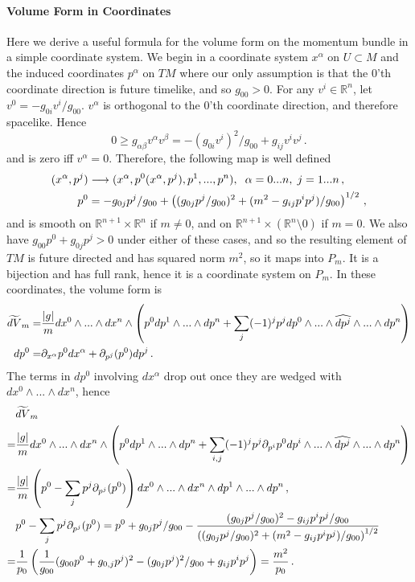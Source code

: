 \paragraph{Volume Form in Coordinates}\label{coord_comp}
Here we derive a useful formula for the volume form on the momentum bundle in a simple coordinate system.  We begin in a coordinate system $x^\alpha$ on $U\subset M$ and the induced coordinates $p^\alpha$ on $TM$ where our only assumption is that the $0$'th coordinate direction is future timelike, and so $g_{00}>0$.  For any $v^i\in \mathbb{R}^n$, let $v^0=-g_{0i}v^i/g_{00}$.  $v^\alpha$ is orthogonal to the $0$'th coordinate direction, and therefore spacelike. Hence 
\begin{equation}
0\geq g_{\alpha \beta}v^\alpha v^\beta=-(g_{0i}v^i)^2/g_{00}+g_{ij}v^iv^j\,.
\end{equation}
and is zero iff $v^\alpha=0$. Therefore, the following map is well defined
\begin{align}
(x^\alpha,p^j)&\longrightarrow (x^\alpha,p^0(x^\alpha,p^j),p^1,...,p^n),  \hspace{2mm} \alpha=0...n, \hspace{1mm} j=1...n \,,\notag\\
 p^0&=-g_{0j}p^j/g_{00}+\left((g_{0j}p^j/g_{00})^2+(m^2-g_{ij}p^ip^j)/g_{00}\right)^{1/2}\,,
\end{align}
and is smooth on $\mathbb{R}^{n+1}\times\mathbb{R}^n$ if $m\neq 0$, and on $\mathbb{R}^{n+1}\times\left(\mathbb{R}^n\setminus{0}\right)$ if $m=0$.  We also have $g_{00}p^0+g_{0j}p^j>0$ under either of these cases, and so the resulting element of $TM$ is future directed and has squared norm $m^2$, so it maps into $P_m$.  It is a bijection and has full rank, hence it is a coordinate system on $P_m$.  In these coordinates, the volume form is
\begin{align}
\widetilde{dV}_m=&\frac{|g|}{m}dx^0\wedge...\wedge dx^n\wedge\left(p^0dp^1\wedge...\wedge dp^n+\sum_j (-1)^j p^j dp^0\wedge...\wedge\widehat{dp^j}\wedge...\wedge dp^n\right)\notag\\
dp^0=&\partial_{x^\alpha} p^0dx^\alpha+\partial_{p^j}(p^0) dp^j\,.
\end{align}
The terms in $dp^0$ involving $dx^\alpha$ drop out once they are wedged with $dx^0\wedge...\wedge dx^n$, hence
\begin{align}
&\widetilde{dV}_m\\
=&\frac{|g|}{m}dx^0\wedge...\wedge dx^n\wedge\left(p^0dp^1\wedge...\wedge dp^n+\sum_{i,j} (-1)^j p^j \partial_{p^i}p^0 dp^i\wedge...\wedge\widehat{dp^j}\wedge...\wedge dp^n\right)\notag\\
=&\frac{|g|}{m}\left(p^0-\sum_{j}p^j \partial_{p^j}(p^0) \right)dx^0\wedge...\wedge dx^n\wedge dp^1\wedge...\wedge dp^n\,,\notag\\
&p^0-\sum_jp^j\partial_{p^j}(p^0)= p^0+g_{0j}p^j/g_{00}-\frac{(g_{0j}p^j/g_{00})^2-g_{ij}p^ip^j/g_{00}}{\left((g_{0j}p^j/g_{00})^2+(m^2-g_{ij}p^ip^j)/g_{00}\right)^{1/2}}\notag\\
=&\frac{1}{p_0}\left(\frac{1}{g_{00}}(g_{00}p^0+g_{0,j}p^j)^2-(g_{0j}p^j)^2/g_{00}+g_{ij}p^ip^j\right)=\frac{m^2}{p_0}\,.\notag
\end{align}

